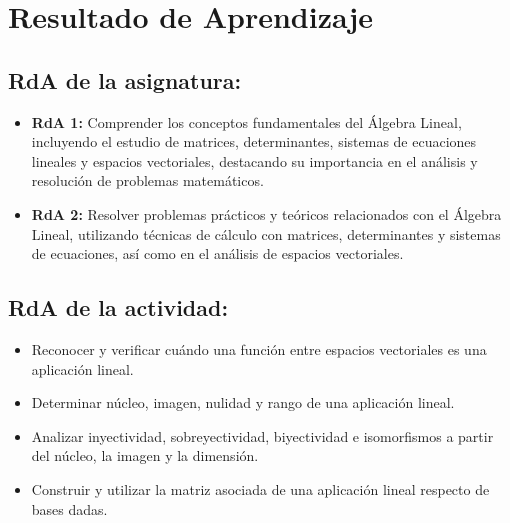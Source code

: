 \documentclass[a4,11pt]{aleph-notas}
\begin{document}
\encabezado 

\section*{Resultado de Aprendizaje}

\subsection*{RdA de la asignatura:}
\begin{itemize}[leftmargin=*]
    \item \textbf{RdA 1:} Comprender los conceptos fundamentales del Álgebra Lineal, incluyendo el estudio de matrices, determinantes, sistemas de ecuaciones lineales y espacios vectoriales, destacando su importancia en el análisis y resolución de problemas matemáticos.
    \item \textbf{RdA 2:} Resolver problemas prácticos y teóricos relacionados con el Álgebra Lineal, utilizando técnicas de cálculo con matrices, determinantes y sistemas de ecuaciones, así como en el análisis de espacios vectoriales.    
\end{itemize}


\subsection*{RdA de la actividad:}
\begin{itemize}[leftmargin=*]
    \item Reconocer y verificar cuándo una función entre espacios vectoriales es una aplicación lineal.
    \item Determinar núcleo, imagen, nulidad y rango de una aplicación lineal.
    \item Analizar inyectividad, sobreyectividad, biyectividad e isomorfismos a partir del núcleo, la imagen y la dimensión.
    \item Construir y utilizar la matriz asociada de una aplicación lineal respecto de bases dadas.
\end{itemize}

\end{document}
